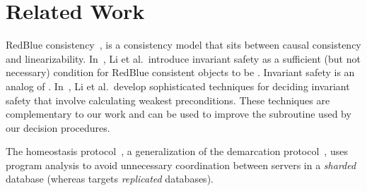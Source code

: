 \section{Related Work}

\newcommand{\sieve}{\textsc{SIEVE}}
RedBlue consistency~\cite{li2012making}, is a consistency model that sits
between causal consistency and linearizability.
%
%
In~\cite{li2012making}, Li et al.\ introduce invariant safety as a
sufficient (but not necessary) condition for RedBlue consistent objects to be
\invariantconfluent{}. Invariant safety is an analog of \invariantclosure{}.
In~\cite{li2014automating}, Li et al.\ develop sophisticated techniques for
deciding invariant safety that involve calculating weakest preconditions.
These techniques are complementary to our work and can be used to improve the
\invariantclosure{} subroutine used by our decision procedures.
%

The homeostasis protocol~\cite{roy2015homeostasis}, a generalization of the
demarcation protocol~\cite{barbara1994demarcation}, uses program analysis to
avoid unnecessary coordination between servers in a \emph{sharded} database
(whereas \invariantconfluence{} targets \emph{replicated} databases).

